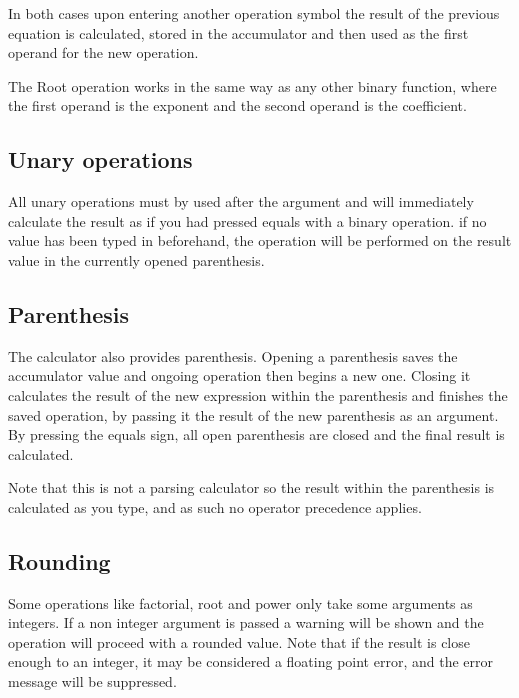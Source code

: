 \documentclass{article}
\begin{document}
	In both cases upon entering another operation symbol the result of the previous equation is calculated, stored in the accumulator and then used as the first operand for the new operation.

	The Root operation works in the same way as any other binary function, where the first operand is the exponent and the second operand is the coefficient. 

\subsection{Unary operations}
	All unary operations must by used after the argument and will immediately calculate the result as if you had pressed equals with a binary operation. if no value has been typed in beforehand, the operation will be performed on the result value in the currently opened parenthesis.

\subsection{Parenthesis}
	The calculator also provides parenthesis. Opening a parenthesis saves the accumulator value and ongoing operation then begins a new one. Closing it calculates the result of the new expression within the parenthesis and finishes the saved operation, by passing it the result of the new parenthesis as an argument. By pressing the equals sign, all open parenthesis are closed and the final result is calculated.
 
	Note that this is not a parsing calculator so the result within the parenthesis is calculated as you type, and as such no operator precedence applies.

\subsection{Rounding}
	Some operations like factorial, root and power only take some arguments as integers.
	If a non integer argument is passed a warning will be shown and the operation will proceed with a rounded value. Note that if the result is close enough to an integer, it may be considered a floating point error, and the error message will be suppressed.\\
	
\end{document}

